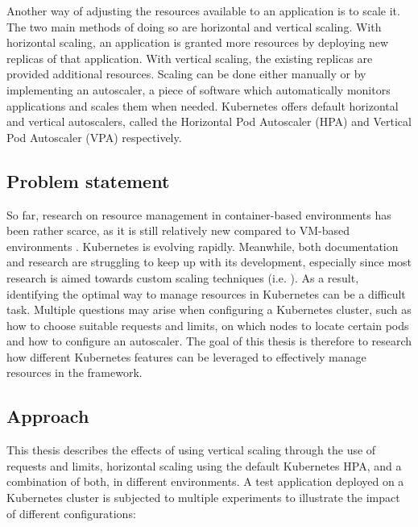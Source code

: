 
Another way of adjusting the resources available to an application is to scale it. The two main methods of doing so are horizontal and vertical scaling. With horizontal scaling, an application is granted more resources by deploying new replicas of that application. With vertical scaling, the existing replicas are provided additional resources. Scaling can be done either manually or by implementing an autoscaler, a piece of software which automatically monitors applications and scales them when needed. Kubernetes offers default horizontal and vertical autoscalers, called the Horizontal Pod Autoscaler (HPA) and Vertical Pod Autoscaler (VPA) respectively.

\subsection{Problem statement}
So far, research on resource management in container-based environments has been rather scarce, as it is still relatively new compared to VM-based environments \citep{Al-DhuraibiYahya2018EiCC}\citep{CoutinhoEmanuel2015Eicc}. Kubernetes is evolving rapidly. Meanwhile, both documentation and research are struggling to keep up with its development, especially since most research is aimed towards custom scaling techniques (i.e. \citep{hyscale}\citep{caravel}). As a result, identifying the optimal way to manage resources in Kubernetes can be a difficult task. Multiple questions may arise when configuring a Kubernetes cluster, such as how to choose suitable requests and limits, on which nodes to locate certain pods and how to configure an autoscaler. The goal of this thesis is therefore to research how different Kubernetes features can be leveraged to effectively manage resources in the framework. 

\subsection{Approach}
This thesis describes the effects of using vertical scaling through the use of requests and limits, horizontal scaling using the default Kubernetes HPA, and a combination of both, in different environments. A test application deployed on a Kubernetes cluster is subjected to multiple experiments to illustrate the impact of different configurations:

